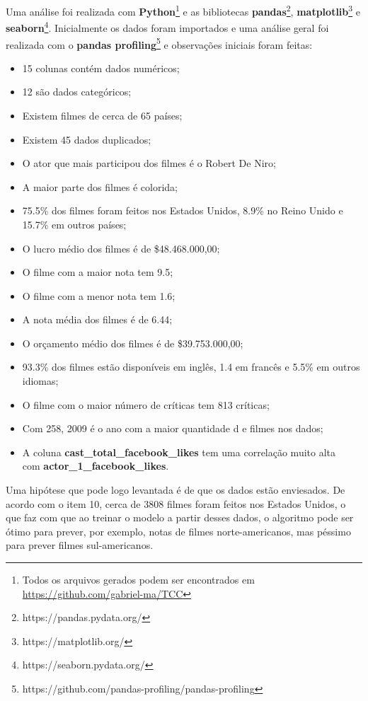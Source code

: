 Uma análise foi realizada com \textbf{Python}\footnote{Todos os arquivos gerados podem ser encontrados em \url{https://github.com/gabriel-ma/TCC}} e as bibliotecas \textbf{pandas}\footnote{https://pandas.pydata.org/}, \textbf{matplotlib}\footnote{https://matplotlib.org/} e \textbf{seaborn}\footnote{https://seaborn.pydata.org/}. Inicialmente os dados foram importados e uma análise geral foi realizada com o \textbf{pandas profiling}\footnote{https://github.com/pandas-profiling/pandas-profiling} e observações iniciais foram feitas:
\begin{itemize}
    \item 15 colunas contém dados numéricos;
    \item 12 são dados categóricos;
    \item Existem filmes de cerca de 65 países;
    \item Existem 45 dados duplicados;
    \item O ator que mais participou dos filmes é o Robert De Niro;
    \item A maior parte dos filmes é colorida;
    \item 75.5\% dos filmes foram feitos nos Estados Unidos, 8.9\% no Reino Unido e 15.7\% em outros países;
    \item O lucro médio dos filmes é de \$48.468.000,00;
    \item O filme com a maior nota tem 9.5;
    \item O filme com a menor nota tem 1.6;
    \item A nota média dos filmes é de 6.44;
    \item O orçamento médio dos filmes é de \$39.753.000,00;
    \item 93.3\% dos filmes estão disponíveis em inglês, 1.4 em francês e 5.5\% em outros idiomas;
    \item O filme com o maior número de críticas tem 813 críticas;
    \item Com 258, 2009 é o ano com a maior quantidade d
    e filmes nos dados;
    \item A coluna \textbf{cast\_total\_facebook\_likes} tem uma correlação muito alta\\ com \textbf{actor\_1\_facebook\_likes}.
\end{itemize}

Uma hipótese que pode logo levantada é de que os dados estão enviesados. De acordo com o item 10, cerca de 3808 filmes foram feitos nos Estados Unidos, o que faz com que ao treinar o modelo a partir desses dados, o algoritmo pode ser ótimo para prever, por exemplo, notas de filmes norte-americanos, mas péssimo para prever filmes sul-americanos.

